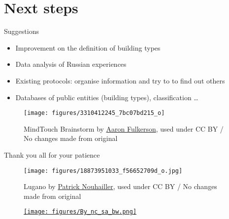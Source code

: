 \documentclass[xcolor=svgnames]{beamer}
\newcommand{\1}{\'{\i}}
\begin{document}
\section[Next]{Next steps}

\begin{frame}{Suggestions}

\begin{itemize}
\item Improvement on the definition of building types
\item Data analysis of Russian experiences
\item Existing protocols: organise information and try to to find out others
\item Databases of public entities (building types), classification \ldots
\end{itemize}

\pause \begin{figure}
\centering
\texttt{[image: figures/3310412245\_7bc07bd215\_o]}
\caption*{{\tiny MindTouch Brainstorm by \href{https://www.flickr.com/photos/roebot/3310412245/}{Aaron Fulkerson}, used under CC BY / No changes made from original}}
\end{figure}


\end{frame}

\begin{frame}{Thank you all for your patience}

\begin{figure}
\centering
\texttt{[image: figures/18873951033\_f56652709d\_o.jpg]}
\caption*{{\tiny Lugano by \href{https://www.flickr.com/photos/patrick_nouhailler/18873951033/in/photolist-uKPW5R-vxHTFd-vvDDP7-xf8XCy-vqdX4g-va9uRp-vPx3hW-vKWWPN-xgrPiW-xV9t87-vawEFY-vq6ApL-vq6wTL-uRoAUF-adASLT-6M8EqV-vQ6X8N-vzeKDY-uQfu7e-uUYHo6-vcU1of-vJNLdQ-vxHRTL-uwDscL-ugW8jR-xT4AVh-ugoVBA-w1YeRM-vxHTQU-vzeJD1-vdgdG1-vPJ2Dq-7Aiwew-6McJPW-6McUGG-zbFTnX-KioiMu-x3k4jN-vDYzi2-xj9RtE-vzeJbh-y5qDeU-vcJzYm-uSwyei-vM7DEa-wdxHwC-xNLU35-xiLmKK-vKWVrC-vztmYZ}{Patrick Nouhailler}, used under CC BY / No changes made from original}}
\end{figure}



\end{frame}

\begin{frame}

\begin{figure}

\href{http://creativecommons.org/licenses/by-nc-sa/4.0/}{\texttt{[image: figures/By\_nc\_sa\_bw.png]}}

\end{figure}

\end{frame}
\end{document}
